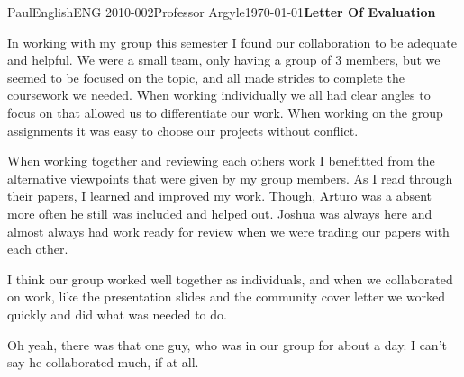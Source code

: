 \documentclass[12pt,letterpaper]{article}
\begin{document}
\begin{mla}{Paul}{English}{ENG 2010-002}{Professor Argyle}{\today}{\textbf{Letter Of Evaluation}}



In working with my group this semester I found our collaboration to be adequate and helpful. We were a small team, only having a group of 3 members, but we seemed to be focused on the topic, and all made strides to complete the coursework we needed. When working individually we all had clear angles to focus on that allowed us to differentiate our work. When working on the group assignments it was easy to choose our projects without conflict.

When working together and reviewing each others work I benefitted from the alternative viewpoints that were given by my group members. As I read through their papers, I learned and improved my work. Though, Arturo was a absent more often he still was included and helped out. Joshua was always here and almost always had work ready for review when we were trading our papers with each other.

I think our group worked well together as individuals, and when we collaborated on work, like the presentation slides and the community cover letter we worked quickly and did what was needed to do. 

Oh yeah, there was that one guy, who was in our group for about a day. I can't say he collaborated much, if at all.




\end{mla}
\end{document}
